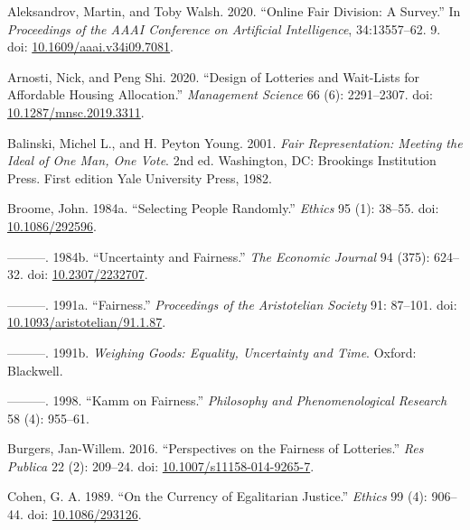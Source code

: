 \documentclass[
  11pt,
  letterpaper,
  DIV=11,
  numbers=noendperiod,
  twoside]{scrartcl}
\newlength{\cslhangindent}
\newenvironment{CSLReferences}[2] %
 {\begin{list}{}{%
  \setlength{\itemindent}{0pt}
  \setlength{\leftmargin}{0pt}
  \setlength{\parsep}{0pt}
  \ifodd #1
   \setlength{\leftmargin}{\cslhangindent}
   \setlength{\itemindent}{-1\cslhangindent}
  \fi
  \setlength{\itemsep}{#2\baselineskip}}}
 {\end{list}}
\begin{document}
\protect{}\label{refs}
\begin{CSLReferences}{1}{0}
Aleksandrov, Martin, and Toby Walsh. 2020. {``Online Fair Division: A
Survey.''} In \emph{Proceedings of the AAAI Conference on Artificial
Intelligence}, 34:13557--62. 9. doi:
\href{https://doi.org/10.1609/aaai.v34i09.7081}{10.1609/aaai.v34i09.7081}.

Arnosti, Nick, and Peng Shi. 2020. {``Design of Lotteries and Wait-Lists
for Affordable Housing Allocation.''} \emph{Management Science} 66 (6):
2291--2307. doi:
\href{https://doi.org/10.1287/mnsc.2019.3311}{10.1287/mnsc.2019.3311}.

Balinski, Michel L., and H. Peyton Young. 2001. \emph{Fair
Representation: Meeting the Ideal of One Man, One Vote}. 2nd ed.
Washington, DC: Brookings Institution Press. First edition Yale
University Press, 1982.

Broome, John. 1984a. {``Selecting People Randomly.''} \emph{Ethics} 95
(1): 38--55. doi: \href{https://doi.org/10.1086/292596}{10.1086/292596}.

---------. 1984b. {``Uncertainty and Fairness.''} \emph{The Economic
Journal} 94 (375): 624--32. doi:
\href{https://doi.org/10.2307/2232707}{10.2307/2232707}.

---------. 1991a. {``Fairness.''} \emph{Proceedings of the Aristotelian
Society} 91: 87--101. doi:
\href{https://doi.org/10.1093/aristotelian/91.1.87}{10.1093/aristotelian/91.1.87}.

---------. 1991b. \emph{Weighing Goods: Equality, Uncertainty and Time}.
Oxford: Blackwell.

---------. 1998. {``Kamm on Fairness.''} \emph{Philosophy and
Phenomenological Research} 58 (4): 955--61.

Burgers, Jan-Willem. 2016. {``Perspectives on the Fairness of
Lotteries.''} \emph{Res Publica} 22 (2): 209--24. doi:
\href{https://doi.org/10.1007/s11158-014-9265-7}{10.1007/s11158-014-9265-7}.

Cohen, G. A. 1989. {``On the Currency of Egalitarian Justice.''}
\emph{Ethics} 99 (4): 906--44. doi:
\href{https://doi.org/10.1086/293126}{10.1086/293126}.


\end{CSLReferences}
\end{document}
